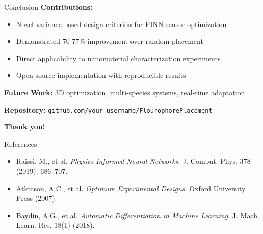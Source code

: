 \documentclass[aspectratio=169]{beamer}
\begin{document}
\begin{frame}{Conclusion}
\textbf{Contributions:}
\begin{itemize}
    \item Novel variance-based design criterion for PINN sensor optimization
    \item Demonstrated 70-77\% improvement over random placement
    \item Direct applicability to nanomaterial characterization experiments
    \item Open-source implementation with reproducible results
\end{itemize}

\vspace{0.5cm}
\textbf{Future Work:} 3D optimization, multi-species systems, real-time adaptation

\vspace{0.5cm}
\centering
\textbf{Repository:} \texttt{github.com/your-username/FlourophorePlacement}

\textbf{Thank you!}
\end{frame}

\begin{frame}{References}
\footnotesize
\begin{itemize}
  \item Raissi, M., et al. \emph{Physics-Informed Neural Networks}. J. Comput. Phys. 378 (2019): 686–707.
  \item Atkinson, A.C., et al. \emph{Optimum Experimental Designs}. Oxford University Press (2007).
  \item Baydin, A.G., et al. \emph{Automatic Differentiation in Machine Learning}. J. Mach. Learn. Res. 18(1) (2018).
\end{itemize}
\end{frame}
\end{document}
